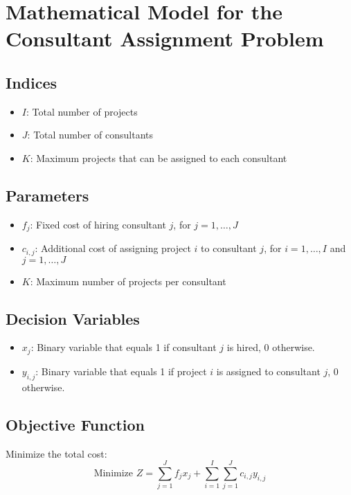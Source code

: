 \documentclass{article}
\begin{document}
\section*{Mathematical Model for the Consultant Assignment Problem}

\subsection*{Indices}
\begin{itemize}
    \item $I$: Total number of projects
    \item $J$: Total number of consultants
    \item $K$: Maximum projects that can be assigned to each consultant
\end{itemize}

\subsection*{Parameters}
\begin{itemize}
    \item $f_j$: Fixed cost of hiring consultant $j$, for $j = 1, \ldots, J$
    \item $c_{i,j}$: Additional cost of assigning project $i$ to consultant $j$, for $i = 1, \ldots, I$ and $j = 1, \ldots, J$
    \item $K$: Maximum number of projects per consultant
\end{itemize}

\subsection*{Decision Variables}
\begin{itemize}
    \item $x_{j}$: Binary variable that equals 1 if consultant $j$ is hired, 0 otherwise.
    \item $y_{i,j}$: Binary variable that equals 1 if project $i$ is assigned to consultant $j$, 0 otherwise.
\end{itemize}

\subsection*{Objective Function}
Minimize the total cost:
\[
\text{Minimize } Z = \sum_{j=1}^{J} f_j x_j + \sum_{i=1}^{I} \sum_{j=1}^{J} c_{i,j} y_{i,j}
\]
\end{document}
